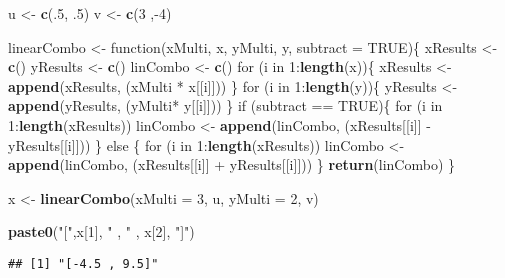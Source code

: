 \documentclass[]{article}
\newenvironment{Shaded}{\begin{snugshade}}{\end{snugshade}}
\newcommand{\KeywordTok}[1]{\textcolor[rgb]{0.13,0.29,0.53}{\textbf{{#1}}}}
\newcommand{\DataTypeTok}[1]{\textcolor[rgb]{0.13,0.29,0.53}{{#1}}}
\newcommand{\DecValTok}[1]{\textcolor[rgb]{0.00,0.00,0.81}{{#1}}}
\newcommand{\StringTok}[1]{\textcolor[rgb]{0.31,0.60,0.02}{{#1}}}
\newcommand{\OtherTok}[1]{\textcolor[rgb]{0.56,0.35,0.01}{{#1}}}
\newcommand{\NormalTok}[1]{{#1}}
\begin{document}
\begin{Shaded}
\begin{Highlighting}[]
\NormalTok{u <-}\StringTok{  }\KeywordTok{c}\NormalTok{(.}\DecValTok{5}\NormalTok{, .}\DecValTok{5}\NormalTok{)}
\NormalTok{v <-}\StringTok{  }\KeywordTok{c}\NormalTok{(}\DecValTok{3} \NormalTok{,-}\DecValTok{4}\NormalTok{)}

\NormalTok{linearCombo <-}\StringTok{ }\NormalTok{function(xMulti, x, yMulti, y, }\DataTypeTok{subtract =} \OtherTok{TRUE}\NormalTok{)\{}
      \NormalTok{xResults  <-}\StringTok{ }\KeywordTok{c}\NormalTok{()}
      \NormalTok{yResults  <-}\StringTok{ }\KeywordTok{c}\NormalTok{()}
      \NormalTok{linCombo <-}\StringTok{ }\KeywordTok{c}\NormalTok{()}
    \NormalTok{for (i in }\DecValTok{1}\NormalTok{:}\KeywordTok{length}\NormalTok{(x))\{  }
      \NormalTok{xResults <-}\StringTok{ }\KeywordTok{append}\NormalTok{(xResults, (xMulti *}\StringTok{ }\NormalTok{x[[i]]))}
    \NormalTok{\}}
    \NormalTok{for (i in }\DecValTok{1}\NormalTok{:}\KeywordTok{length}\NormalTok{(y))\{ }
      \NormalTok{yResults <-}\StringTok{ }\KeywordTok{append}\NormalTok{(yResults, (yMulti*}\StringTok{ }\NormalTok{y[[i]]))}
    \NormalTok{\}}
    \NormalTok{if (subtract ==}\StringTok{ }\OtherTok{TRUE}\NormalTok{)\{ }
    \NormalTok{for (i in }\DecValTok{1}\NormalTok{:}\KeywordTok{length}\NormalTok{(xResults))}
      \NormalTok{linCombo <-}\StringTok{ }\KeywordTok{append}\NormalTok{(linCombo, (xResults[[i]] -}\StringTok{ }\NormalTok{yResults[[i]]))}
    \NormalTok{\} else \{}
    \NormalTok{for (i in }\DecValTok{1}\NormalTok{:}\KeywordTok{length}\NormalTok{(xResults))}
      \NormalTok{linCombo <-}\StringTok{ }\KeywordTok{append}\NormalTok{(linCombo, (xResults[[i]] +}\StringTok{ }\NormalTok{yResults[[i]]))}
    \NormalTok{\}}
    \KeywordTok{return}\NormalTok{(linCombo)}
\NormalTok{\}}

\NormalTok{x <-}\StringTok{ }\KeywordTok{linearCombo}\NormalTok{(}\DataTypeTok{xMulti =} \DecValTok{3}\NormalTok{, u, }\DataTypeTok{yMulti =} \DecValTok{2}\NormalTok{, v)}

\KeywordTok{paste0}\NormalTok{(}\StringTok{"["}\NormalTok{,x[}\DecValTok{1}\NormalTok{], }\StringTok{" , "} \NormalTok{, x[}\DecValTok{2}\NormalTok{], }\StringTok{"]"}\NormalTok{)}
\end{Highlighting}
\end{Shaded}

\begin{verbatim}
## [1] "[-4.5 , 9.5]"
\end{verbatim}
\end{document}
